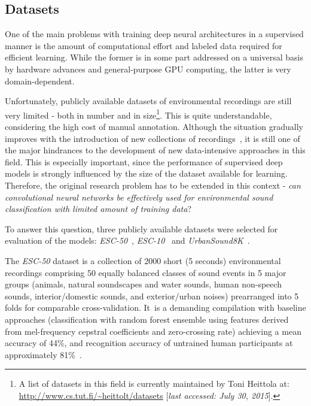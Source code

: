 \documentclass{article}
\begin{document}
\subsection{Datasets}

One of the main problems with training deep neural architectures in a supervised manner is the amount of computational effort and labeled data required for efficient learning. While the former is in some part addressed on a universal basis by hardware advances and general-purpose GPU computing, the latter is very domain-dependent.

Unfortunately, publicly available datasets of environmental recordings are still very limited - both in number and in size\footnote{A list of datasets in this field is currently maintained by Toni Heittola at:\\\url{http://www.cs.tut.fi/~heittolt/datasets} [\textit{last accessed: July 30, 2015}].}. This is quite understandable, considering the high cost of manual annotation. Although the situation gradually improves with the introduction of new collections of recordings~\cite{salamon2014dataset, piczak2015esc}, it is still one of the major hindrances to the development of new data-intensive approaches in this field. This is especially important, since the performance of supervised deep models is strongly influenced by the size of the dataset available for learning. Therefore, the original research problem has to be extended in this context - \textit{can convolutional neural networks be effectively used for environmental sound classification with limited amount of training data}?

To answer this question, three publicly available datasets were selected for evaluation of the models: \textit{ESC-50}~\cite{piczak2015esc}, \textit{ESC-10}~\cite{piczak2015esc} and \textit{UrbanSound8K}~\cite{salamon2014dataset}.

The \textit{ESC-50} dataset is a collection of 2000 short (5 seconds) environmental recordings comprising 50 equally balanced classes of sound events in 5 major groups (animals, natural soundscapes and water sounds, human non-speech sounds, interior/domestic sounds, and exterior/urban noises) prearranged into 5 folds for comparable cross-validation. It~is a demanding compilation with baseline approaches (classification with random forest ensemble using features derived from mel-frequency cepstral coefficients and zero-crossing rate) achieving a mean accuracy of 44\%, and recognition accuracy of untrained human participants at approximately 81\%~\cite{piczak2015esc}.
\end{document}

